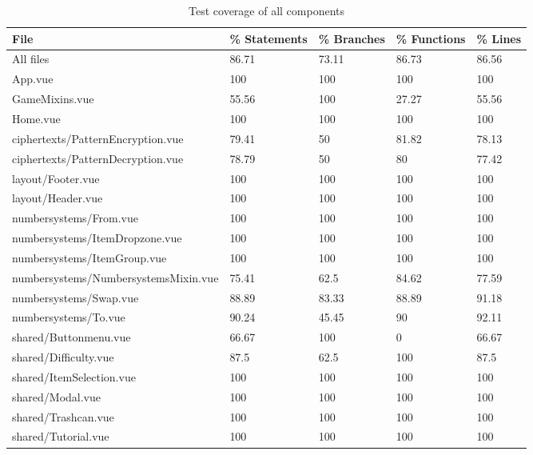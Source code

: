 \begin{table}
    \begin{adjustwidth}{-2cm}{}
        \caption{Test coverage of all components}
        \centering
        \begin{tabular}{|l|l|l|l|l|}
        \hline
            File & \% Statements & \% Branches & \% Functions & \% Lines \\ \hline
            All files & 86.71 & 73.11 & 86.73 & 86.56 \\ \hline
            App.vue & 100 & 100 & 100 & 100 \\ \hline
            GameMixins.vue & 55.56 & 100 & 27.27 & 55.56 \\ \hline
            Home.vue & 100 & 100 & 100 & 100 \\ \hline
            ciphertexts/PatternEncryption.vue & 79.41 & 50 & 81.82 & 78.13 \\ \hline
            ciphertexts/PatternDecryption.vue & 78.79 & 50 & 80 & 77.42 \\ \hline
            layout/Footer.vue & 100 & 100 & 100 & 100 \\ \hline
            layout/Header.vue & 100 & 100 & 100 & 100 \\ \hline
            numbersystems/From.vue & 100 & 100 & 100 & 100 \\ \hline
            numbersystems/ItemDropzone.vue & 100 & 100 & 100 & 100 \\ \hline
            numbersystems/ItemGroup.vue & 100 & 100 & 100 & 100 \\ \hline
            numbersystems/NumbersystemsMixin.vue & 75.41 & 62.5 & 84.62 & 77.59 \\ \hline
            numbersystems/Swap.vue & 88.89 & 83.33 & 88.89 & 91.18 \\ \hline
            numbersystems/To.vue & 90.24 & 45.45 & 90 & 92.11 \\ \hline
            shared/Buttonmenu.vue & 66.67 & 100 & 0 & 66.67 \\ \hline
            shared/Difficulty.vue & 87.5 & 62.5 & 100 & 87.5 \\ \hline
            shared/ItemSelection.vue & 100 & 100 & 100 & 100 \\ \hline
            shared/Modal.vue & 100 & 100 & 100 & 100 \\ \hline
            shared/Trashcan.vue & 100 & 100 & 100 & 100 \\ \hline
            shared/Tutorial.vue & 100 & 100 & 100 & 100 \\ \hline

\end{tabular}
\end{adjustwidth}
\end{table}
